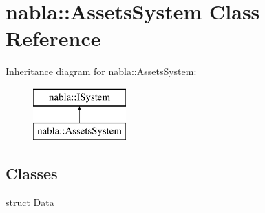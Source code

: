 \hypertarget{classnabla_1_1_assets_system}{}\section{nabla\+::Assets\+System Class Reference}
\label{classnabla_1_1_assets_system}
Inheritance diagram for nabla\+::Assets\+System\+:\begin{figure}[H]
\begin{center}
\leavevmode
\includegraphics[height=2.000000cm]{classnabla_1_1_assets_system}
\end{center}
\end{figure}
\subsection*{Classes}
\begin{DoxyCompactItemize}
\item 
struct \mbox{\hyperlink{structnabla_1_1_assets_system_1_1_data}{Data}}
\end{DoxyCompactItemize}

